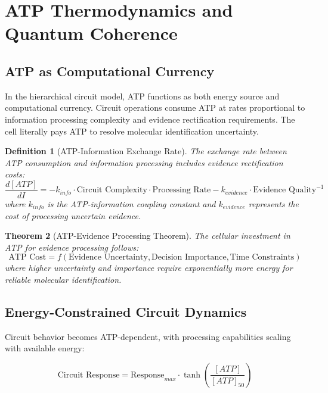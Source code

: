 \documentclass[12pt,a4paper]{article}
\newtheorem{theorem}{Theorem}[section]
\newtheorem{definition}[theorem]{Definition}
\begin{document}
\section{ATP Thermodynamics and Quantum Coherence}

\subsection{ATP as Computational Currency}

In the hierarchical circuit model, ATP functions as both energy source and computational currency. Circuit operations consume ATP at rates proportional to information processing complexity and evidence rectification requirements. The cell literally pays ATP to resolve molecular identification uncertainty.

\begin{definition}[ATP-Information Exchange Rate]
The exchange rate between ATP consumption and information processing includes evidence rectification costs:
\begin{equation}
\frac{d[ATP]}{dI} = -k_{info} \cdot \text{Circuit Complexity} \cdot \text{Processing Rate} - k_{evidence} \cdot \text{Evidence Quality}^{-1}
\end{equation}
where $k_{info}$ is the ATP-information coupling constant and $k_{evidence}$ represents the cost of processing uncertain evidence.
\end{definition}

\begin{theorem}[ATP-Evidence Processing Theorem]
The cellular investment in ATP for evidence processing follows:
\begin{equation}
\text{ATP Cost} = f(\text{Evidence Uncertainty}, \text{Decision Importance}, \text{Time Constraints})
\end{equation}
where higher uncertainty and importance require exponentially more energy for reliable molecular identification.
\end{theorem}

\subsection{Energy-Constrained Circuit Dynamics}

Circuit behavior becomes ATP-dependent, with processing capabilities scaling with available energy:

\begin{equation}
\text{Circuit Response} = \text{Response}_{max} \cdot \tanh\left(\frac{[ATP]}{[ATP]_{50}}\right)
\end{equation}
\end{document}
